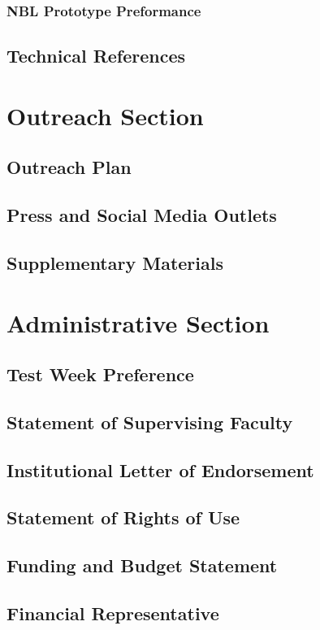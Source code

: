 \documentclass{article}
\begin{document}
\subsubsection{NBL Prototype Preformance}
\subsection{Technical References}


\section{Outreach Section}
\subsection{Outreach Plan}
\subsection{Press and Social Media Outlets}
\subsection{Supplementary Materials}


\section{Administrative Section}
\subsection{Test Week Preference}
\subsection{Statement of Supervising Faculty}
\subsection{Institutional Letter of Endorsement}
\subsection{Statement of Rights of Use}
\subsection{Funding and Budget Statement}
\subsection{Financial Representative}
\end{document}
